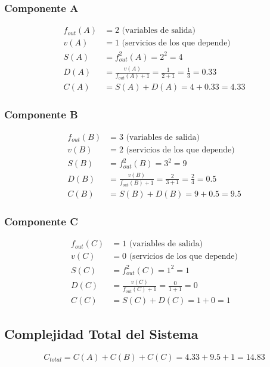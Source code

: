 \subsubsection{Componente A}
\begin{align}
    f_{out}(A) &= 2 \text{ (variables de salida)} \\
    v(A) &= 1 \text{ (servicios de los que depende)}\\
    S(A) &= f_{out}^2(A) = 2^2 = 4 \\
    D(A) &= \frac{v(A)}{f_{out}(A) + 1} = \frac{1}{2 + 1} = \frac{1}{3} = 0.33 \\
    C(A) &= S(A) + D(A) = 4 + 0.33 = 4.33
\end{align}

\subsubsection{Componente B}
\begin{align}
    f_{out}(B) &= 3 \text{ (variables de salida)} \\
    v(B) &= 2 \text{ (servicios de los que depende)} \\
    S(B) &= f_{out}^2(B) = 3^2 = 9 \\
    D(B) &= \frac{v(B)}{f_{out}(B) + 1} = \frac{2}{3 + 1} = \frac{2}{4} = 0.5 \\
    C(B) &= S(B) + D(B) = 9 + 0.5 = 9.5
\end{align}

\subsubsection{Componente C}
\begin{align}
    f_{out}(C) &= 1 \text{ (variables de salida)} \\
    v(C) &= 0 \text{ (servicios de los que depende)} \\
    S(C) &= f_{out}^2(C) = 1^2 = 1 \\
    D(C) &= \frac{v(C)}{f_{out}(C) + 1} = \frac{0}{1 + 1} = 0 \\
    C(C) &= S(C) + D(C) = 1 + 0 = 1
\end{align}

\subsection{Complejidad Total del Sistema}\label{subsec:complejidad-total-del-sistema}
\[C_{total} = C(A) + C(B) + C(C) = 4.33 + 9.5 + 1 = 14.83\]

